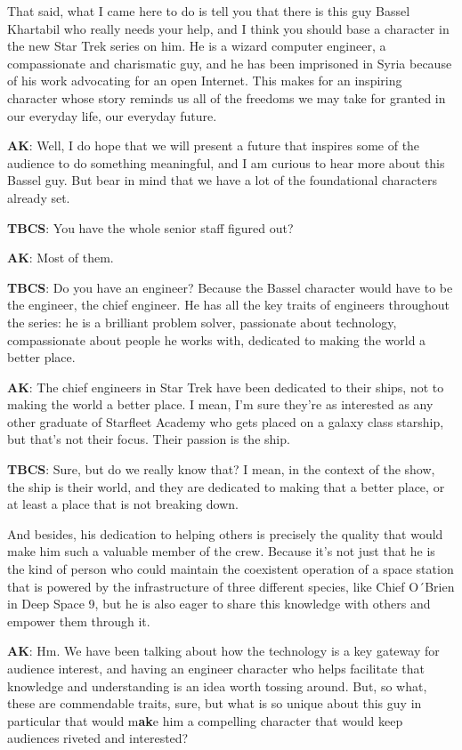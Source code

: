 That said, what I came here to do is tell you that there is this guy
Bassel Khartabil who really needs your help, and I think you should base
a character in the new Star Trek series on him. He is a wizard computer
engineer, a compassionate and charismatic guy, and he has been
imprisoned in Syria because of his work advocating for an open Internet.
This makes for an inspiring character whose story reminds us all of the
freedoms we may take for granted in our everyday life, our everyday
future.

\textbf{AK}: Well, I do hope that we will present a future that inspires
some of the audience to do something meaningful, and I am curious to
hear more about this Bassel guy. But bear in mind that we have a lot of
the foundational characters already set.

\textbf{TBCS}: You have the whole senior staff figured out?

\textbf{AK}: Most of them.

\textbf{TBCS}: Do you have an engineer? Because the Bassel character
would have to be the engineer, the chief engineer. He has all the key
traits of engineers throughout the series: he is a brilliant problem
solver, passionate about technology, compassionate about people he works
with, dedicated to making the world a better place.

\textbf{AK}: The chief engineers in Star Trek have been dedicated to
their ships, not to making the world a better place. I mean, I'm sure
they're as interested as any other graduate of Starfleet Academy who
gets placed on a galaxy class starship, but that's not their focus.
Their passion is the ship.

\textbf{TBCS}: Sure, but do we really know that? I mean, in the context
of the show, the ship is their world, and they are dedicated to making
that a better place, or at least a place that is not breaking down.

And besides, his dedication to helping others is precisely the quality
that would make him such a valuable member of the crew. Because it's not
just that he is the kind of person who could maintain the coexistent
operation of a space station that is powered by the infrastructure of
three different species, like Chief O´Brien in Deep Space 9, but he is
also eager to share this knowledge with others and empower them through
it.

\textbf{AK}: Hm. We have been talking about how the technology is a key
gateway for audience interest, and having an engineer character who
helps facilitate that knowledge and understanding is an idea worth
tossing around. But, so what, these are commendable traits, sure, but
what is so unique about this guy in particular that would m\textbf{ak}e
him a compelling character that would keep audiences riveted and
interested?

